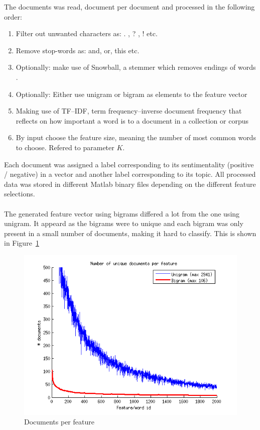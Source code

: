 The documents was read, document per document and processed in the following order: 
\begin{enumerate}
\item Filter out unwanted characters as: . , ? , ! etc.
\item Remove stop-words as: and, or, this etc.
\item Optionally: make use of Snowball, a stemmer which removes endings of words \citep{snowball_url}.
\item Optionally: Either use unigram or bigram as elements to the feature vector
\item Making use of TF–IDF, term frequency–inverse document frequency that
reflects on how important a word is to a document in a collection or corpus
\item By input choose the feature size, meaning the number of most common words to choose. Refered to parameter $K$.
\end{enumerate}
Each document was assigned a label corresponding to its sentimentality (positive / negative) in a vector and another label corresponding to its topic. All processed data was stored in different Matlab binary files depending on the different feature selections. 
\\\\
The generated feature vector using bigrams differed a lot from the one using unigram. It appeard as the bigrams were to unique and each bigram was only present in a small number of documents, making it hard to classify. This is shown in Figure~\ref{fig:docperfeature} 
\begin{figure}[h!]
\centering
\includegraphics[scale = 0.6]{fig/documents_per_feature.png}
\caption{Documents per feature}
\label{fig:docperfeature}
\end{figure} 


